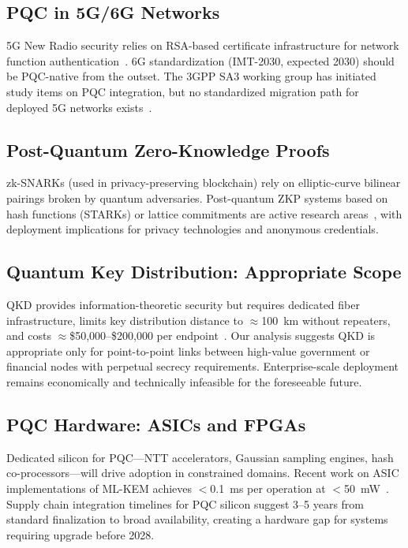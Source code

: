 \documentclass[journal]{IEEEtran}
\begin{document}
\subsection{PQC in 5G/6G Networks}

5G New Radio security relies on RSA-based certificate infrastructure for network
function authentication~\cite{3gpp2023security}. 6G standardization (IMT-2030,
expected 2030) should be PQC-native from the outset. The 3GPP SA3 working group
has initiated study items on PQC integration, but no standardized migration
path for deployed 5G networks exists~\cite{europeancommission2022b5g}.

\subsection{Post-Quantum Zero-Knowledge Proofs}

zk-SNARKs (used in privacy-preserving blockchain) rely on elliptic-curve
bilinear pairings broken by quantum adversaries. Post-quantum ZKP systems
based on hash functions (STARKs) or lattice commitments are active research
areas~\cite{boneh2020lattice}, with deployment implications for privacy
technologies and anonymous credentials.

\subsection{Quantum Key Distribution: Appropriate Scope}

QKD provides information-theoretic security but requires dedicated fiber
infrastructure, limits key distribution distance to $\approx$100~km without
repeaters, and costs $\approx$\$50,000--\$200,000 per endpoint~\cite{pirandola2020advances}.
Our analysis suggests QKD is appropriate only for point-to-point links between
high-value government or financial nodes with perpetual secrecy requirements.
Enterprise-scale deployment remains economically and technically infeasible
for the foreseeable future.

\subsection{PQC Hardware: ASICs and FPGAs}

Dedicated silicon for PQC---NTT accelerators, Gaussian sampling engines,
hash co-processors---will drive adoption in constrained domains. Recent work
on ASIC implementations of ML-KEM achieves $<$0.1~ms per operation at
$<$50~mW~\cite{ngo2021hardware}. Supply chain integration timelines for
PQC silicon suggest 3--5 years from standard finalization to broad availability,
creating a hardware gap for systems requiring upgrade before 2028.
\end{document}
